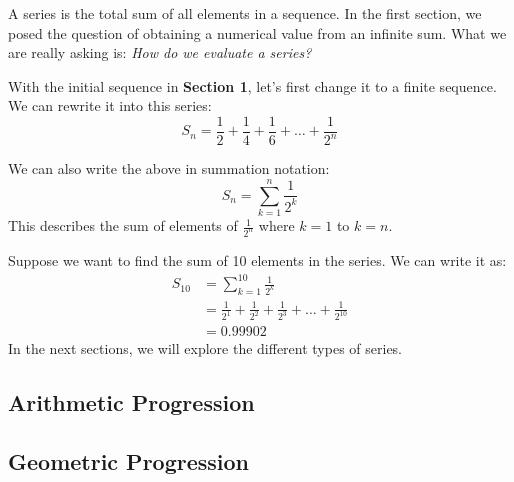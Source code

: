 \documentclass[12pt]{article}
\begin{document}
A series is the total sum of all elements in a sequence. In the first section, we posed the question of obtaining a numerical value from an infinite sum. What we are really asking is: \textit{How do we evaluate a series?}

With the initial sequence in \textbf{Section 1}, let's first change it to a finite sequence. We can rewrite it into this series:
\[
	S_{n} = \frac{1}{2} + \frac{1}{4} + \frac{1}{6} + \dots + \frac{1}{2^{n}}
\]

We can also write the above in summation notation:
\[
	S_{n} = \displaystyle\sum_{k=1}^{n}\frac{1}{2^{k}}
\]
This describes the sum of elements of $\displaystyle\frac{1}{2^{n}}$ where $k=1$ to $k=n$.

Suppose we want to find the sum of 10 elements in the series. We can write it as:
\begin{align*}
	S_{10} & = \displaystyle\sum_{k=1}^{10}\frac{1}{2^{k}}                                    \\
	       & = \frac{1}{2^{1}} + \frac{1}{2^{2}} + \frac{1}{2^{3}} + \dots + \frac{1}{2^{10}} \\
         & = 0.99902
\end{align*}
In the next sections, we will explore the different types of series.

\subsection{Arithmetic Progression}



\subsection{Geometric Progression}
\end{document}
